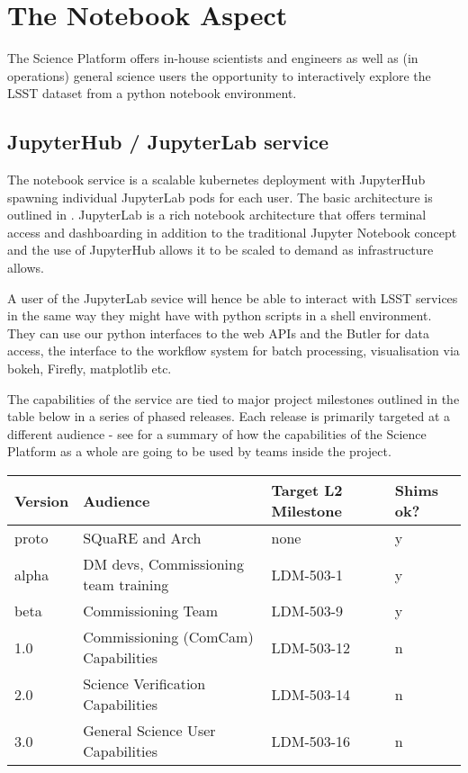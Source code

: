 \section{The Notebook Aspect}\label{notebook-aspect}

The Science Platform offers in-house scientists and engineers as well as (in operations) general science users the opportunity to interactively explore the LSST dataset from a python notebook environment.

\subsection{JupyterHub / JupyterLab service}\label{jupyterhub-jupyterlab-service}

The notebook service is a scalable kubernetes deployment with JupyterHub spawning individual JupyterLab pods for each user. The basic architecture is outlined in . JupyterLab is a rich notebook architecture that offers terminal access and dashboarding in addition to the traditional Jupyter Notebook concept and the use of JupyterHub allows it to be scaled to demand as infrastructure allows.

A user of the JupyterLab sevice will hence be able to interact with LSST services in the same way they might have with python scripts in a shell environment. They can use our python interfaces to the web APIs and the Butler for data access, the interface to the workflow system for batch processing, visualisation via bokeh, Firefly, matplotlib etc. 

The capabilities of the service are tied to major project milestones outlined in the table below in a series of phased releases.  Each release is primarily targeted at a different audience -  see  for a summary of how the capabilities of the Science Platform as a whole are going to be used by teams inside the project. 

\begin{footnotesize}
\begin{longtable}[c]{|l|l|l|l|}
\toprule
Version & Audience & Target L2 Milestone & Shims ok?\tabularnewline
\midrule
\endhead
proto & SQuaRE and Arch & none & y\tabularnewline
alpha & DM devs, Commissioning team training & LDM-503-1 &
y\tabularnewline
beta & Commissioning Team & LDM-503-9 & y\tabularnewline
1.0 & Commissioning (ComCam) Capabilities & LDM-503-12 &
n\tabularnewline
2.0 & Science Verification Capabilities & LDM-503-14 & n\tabularnewline
3.0 & General Science User Capabilities & LDM-503-16 & n\tabularnewline
\bottomrule
\end{longtable}
\end{footnotesize}

